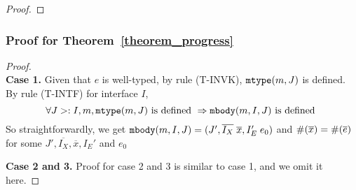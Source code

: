 \begin{proof}
\end{proof}

\subsubsection{Proof for Theorem~\ref{theorem_progress}}
\begin{proof}~\\
\noindent \textbf{Case 1.}
Given that $e$ is well-typed, by rule (T-INVK), $\texttt{mtype}(m, J)$ is defined.
By rule (T-INTF) for interface $I$,
    \[ \forall J >: I, m, \texttt{mtype}(m, J) \text{ is defined } \Rightarrow \texttt{mbody}(m, I, J) \text{ is defined } \]
So straightforwardly, we get $ \texttt{mbody}(m, I, J) = (J', \overline{I_X} \; \overline{x}, I'_E \; e_0) $ and
         $\#(\overline{x}) = \#(\overline{e})$ for some $J', \overline{I_X}, \overline{x}, I_E'$ and $e_0$
         
\noindent \textbf{Case 2 and 3.} Proof for case 2 and 3 is similar to case 1, and we omit it here.
\end{proof}